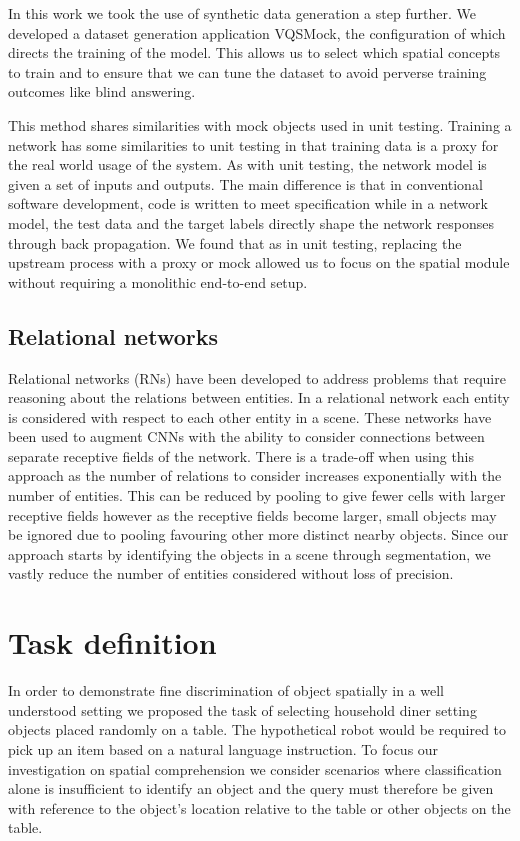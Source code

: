 \documentclass[conference]{IEEEtran}
\begin{document}
In this work we took the use of synthetic data generation a step further.  We developed a dataset generation application VQSMock, the configuration of which directs the training of the model.  This allows us to select which spatial concepts to train and to ensure that we can tune the dataset to avoid perverse training outcomes like blind answering.   

This method shares similarities with mock objects used in unit testing\cite{RN88}.  Training a network has some similarities to unit testing in that  training data is a proxy for the real world usage of the system.  As with unit testing, the network model is given a set of inputs and outputs.  The main difference is that in conventional software development, code is written to meet specification while in a network model, the test data and the target labels  directly shape the network responses through back propagation.  We found that as in unit testing, replacing the upstream process with a proxy or mock allowed us to focus on the spatial module without requiring a monolithic end-to-end setup.

    \subsection{Relational networks}

Relational networks (RNs) have been developed to address problems that require reasoning about the relations between entities\cite{RN1, RN38}.  In a relational network each entity is considered with respect to each other entity in a scene.  These networks have been used to augment CNNs with the ability to consider connections between separate receptive fields of the network.  There is a trade-off when using this approach as the number of relations to consider increases exponentially with the number of entities.  This can be reduced by pooling to give fewer cells with larger receptive fields however as the receptive fields become larger, small objects may be ignored due to pooling favouring other more distinct nearby objects.  Since our approach starts by identifying the objects in a scene through segmentation, we vastly reduce the number of entities considered without loss of precision.

    \section{Task definition}

In order to demonstrate fine discrimination of object spatially in a well understood setting we proposed the task of selecting household diner setting objects placed randomly on a table.  The hypothetical robot would be required to pick up an item based on a natural language instruction.  To focus our investigation on spatial comprehension we consider scenarios where classification alone is insufficient to identify an object and the query must therefore be given with reference to the object's location relative to the table or other objects on the table. 
\end{document}
